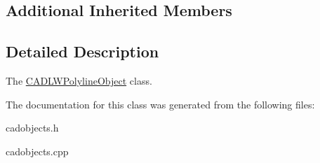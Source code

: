 \subsection*{Additional Inherited Members}


\subsection{Detailed Description}
The \hyperlink{class_c_a_d_l_w_polyline_object}{C\+A\+D\+L\+W\+Polyline\+Object} class. 

The documentation for this class was generated from the following files\+:\begin{DoxyCompactItemize}
\item 
cadobjects.\+h\item 
cadobjects.\+cpp\end{DoxyCompactItemize}
